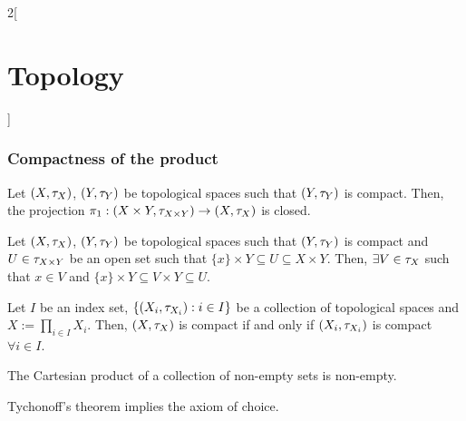 \documentclass[../../../main.tex]{subfiles}
\begin{document}
\begin{multicols}{2}[\section{Topology}]
    \subsubsection{Compactness of the product}
    \begin{prop}
        Let $(X,\tau_X)$, $(Y,\tau_Y)$ be topological spaces such that $(Y,\tau_Y)$ is compact. Then, the projection $\pi_1:(X\times Y,\tau_{X\times Y})\rightarrow (X,\tau_X)$ is closed.
    \end{prop}
    \begin{lemma}
        Let $(X,\tau_X)$, $(Y,\tau_Y)$ be topological spaces such that $(Y,\tau_Y)$ is compact and $U\in\tau_{X\times Y}$ be an open set such that $\{x\}\times Y\subseteq U\subseteq X\times Y$. Then, $\exists V\in\tau_X$ such that $x\in V$ and $\{x\}\times Y\subseteq V\times Y\subseteq U$.
    \end{lemma}
    \begin{theorem}
        Let $I$ be an index set, $\{(X_i,\tau_{X_i}):i\in I\}$ be a collection of topological spaces and $X:=\prod_{i\in I}X_i$. Then, $(X,\tau_X)$ is compact if and only if $(X_i,\tau_{X_i})$ is compact $\forall i\in I$.
    \end{theorem}
    \begin{axiom}
        The Cartesian product of a collection of non-empty sets is non-empty.
    \end{axiom}
    \begin{theorem}
        Tychonoff's theorem implies the axiom of choice.
    \end{theorem}

\end{multicols}
\end{document}
